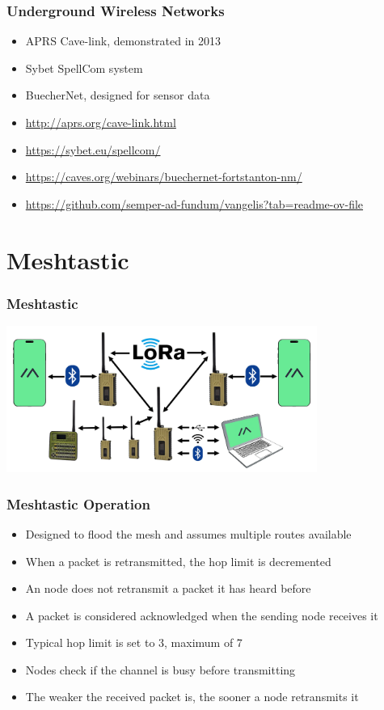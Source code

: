 \documentclass{beamer}
\begin{document}
\begin{frame}
\frametitle{Underground Wireless Networks}

\begin{itemize}
	\item APRS Cave-link, demonstrated in 2013
	\item Sybet SpellCom system
	\item BuecherNet, designed for sensor data
	\item \tiny\url{http://aprs.org/cave-link.html}
	\item \tiny\url{https://sybet.eu/spellcom/}
	\item \tiny\url{https://caves.org/webinars/buechernet-fortstanton-nm/}
	\item \tiny\url{https://github.com/semper-ad-fundum/vangelis?tab=readme-ov-file}
\end{itemize}
\end{frame}

\section{Meshtastic}

\begin{frame}
\frametitle{Meshtastic}

\begin{center}
\includegraphics[width=4.0in]{../images/lora-topology-2.png}
\end{center}

\end{frame}


\begin{frame}

\frametitle{Meshtastic Operation}

\begin{itemize}
\item Designed to flood the mesh and assumes multiple routes available
\item When a packet is retransmitted, the hop limit is decremented
\item An node does not retransmit a packet it has heard before
\item A packet is considered acknowledged when the sending node receives it
\item Typical hop limit is set to 3, maximum of 7
\item Nodes check if the channel is busy before transmitting
\item The weaker the received packet is, the sooner a node retransmits it
\end{itemize}

\end{frame}
\end{document}
